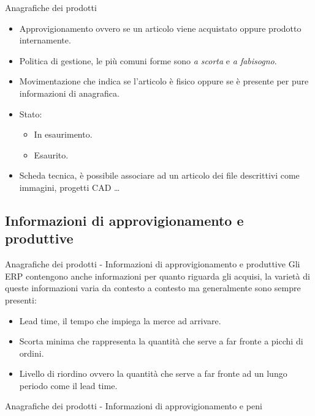 \documentclass{beamer}
\begin{document}
\begin{frame}{Anagrafiche dei prodotti}
    \begin{itemize}
        \item Approvigionamento ovvero se un articolo viene acquistato oppure prodotto internamente.
        \item Politica di gestione, le più comuni forme sono \textit{a scorta} e \textit{a fabisogno}.
        \item Movimentazione che indica se l'articolo è fisico oppure se è presente per pure informazioni di anagrafica.
        \item Stato:
              \begin{itemize}
                  \item In esaurimento.
                  \item Esaurito.
              \end{itemize}
        \item Scheda tecnica, è possibile associare ad un articolo dei file descrittivi come immagini, progetti CAD \dots
    \end{itemize}
\end{frame}

\subsection{Informazioni di approvigionamento e produttive}
\begin{frame}{Anagrafiche dei prodotti - Informazioni di approvigionamento e produttive}
    Gli ERP contengono anche informazioni per quanto riguarda gli acquisi, la varietà di queste informazioni varia da contesto a contesto ma generalmente sono sempre presenti:
    \begin{itemize}
        \item Lead time, il tempo che impiega la merce ad arrivare.
        \item Scorta minima che rappresenta la quantità che serve a far fronte a picchi di ordini.
        \item Livello di riordino ovvero la quantità che serve a far fronte ad un lungo periodo come il lead time.
    \end{itemize}
\end{frame}

\begin{frame}{Anagrafiche dei prodotti - Informazioni di approvigionamento e peni}
    \begin{center}
    \end{center}
\end{frame}
\end{document}
